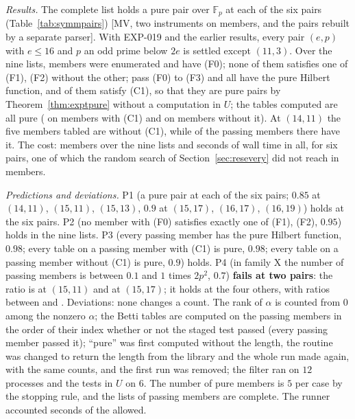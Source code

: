 \documentclass[11pt]{article}
\theoremstyle{definition}
\theoremstyle{remark}
\newcommand{\EXP}[1]{\mbox{EXP-#1}}
\newcommand{\F}{\mathbb{F}}
\begin{document}
\emph{Results.} The complete list holds a pure pair over $\F_p$ at each of the six pairs (Table~\ref{tab:symmpairs}) [MV, two instruments on \nsymSample{} members, and the pairs rebuilt by a separate parser]. With \EXP{019} and the earlier results, every pair $(e,p)$ with $e\le16$ and $p$ an odd prime below $2e$ is settled except $(11,3)$. Over the nine lists, \nsymMembers{} members were enumerated and \nsymFZero{} have (F0); none of them satisfies one of (F1), (F2) without the other; \nsymPassing{} pass (F0) to (F3) and all have the pure Hilbert function, and \nsymCOne{} of them satisfy (C1), so that they are pure pairs by Theorem~\ref{thm:exptpure} without a computation in $U$; the \nsymTables{} tables computed are all pure (\nsymTablesCOne{} on members with (C1) and \nsymTablesNoCOne{} on members without it). At $(14,11)$ the five members tabled are without (C1), while \nsymFourteenElevenCOne{} of the \nsymFourteenElevenPassing{} passing members there have it. The cost: \nsymMembers{} members over the nine lists and \nsymWall{} seconds of wall time in all, for six pairs, one of which the random search of Section~\ref{sec:resevery} did not reach in \nevtFourteenElevenExamined{} members.

\begin{table}[htbp]
\centering\scriptsize

\caption{One pure pair over $\F_p$ at each of the six pairs settled by \EXP{020}: the pair, the exponent $t$, the stratum, the forms (in the monomials $x^ay^bz^c$, coefficients of least absolute value) and the length of $U/(Uf+Ug)$; the script checks the stratum of each pair and the stored table $(1,2,2,1)$ on $(0,e,3e,4e)$, and the two instruments agree.}
\label{tab:symmpairs}
\end{table}

\emph{Predictions and deviations.} P1 (a pure pair at each of the six pairs; $0.85$ at $(14,11)$, $(15,11)$, $(15,13)$, $0.9$ at $(15,17)$, $(16,17)$, $(16,19)$) holds at the six pairs. P2 (no member with (F0) satisfies exactly one of (F1), (F2), $0.95$) holds in the nine lists. P3 (every passing member has the pure Hilbert function, $0.98$; every table on a passing member with (C1) is pure, $0.98$; every table on a passing member without (C1) is pure, $0.9$) holds. P4 (in family X the number of passing members is between $0.1$ and $1$ times $2p^2$, $0.7$) \textbf{fails at two pairs}: the ratio is \nsymRatioFifteenEleven{} at $(15,11)$ and \nsymRatioFifteenSeventeen{} at $(15,17)$; it holds at the four others, with ratios between \nsymRatioLow{} and \nsymRatioHigh{}. Deviations: none changes a count. The rank of $\alpha$ is counted from $0$ among the nonzero $\alpha$; the Betti tables are computed on the passing members in the order of their index whether or not the staged test passed (every passing member passed it); ``pure'' was first computed without the length, the routine was changed to return the length from the library and the whole run made again, with the same counts, and the first run was removed; the filter ran on $12$ processes and the tests in $U$ on $6$. The number of pure members is $5$ per case by the stopping rule, and the lists of passing members are complete. The runner accounted \nsymSeconds{} seconds of the \nsymLimit{} allowed.
\end{document}
